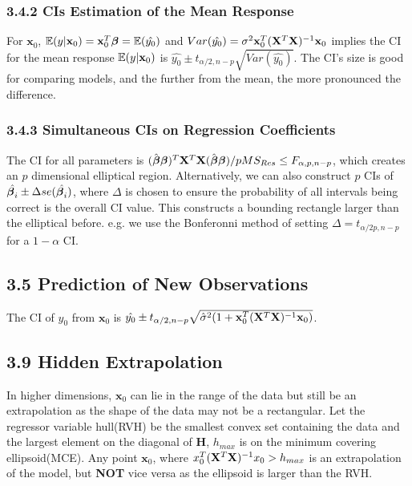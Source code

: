 \begin{multicols*}{3}
\subsubsection{3.4.2 CIs Estimation of the Mean Response}
For $\mathbf{x}_0$, $\mathbb{E}(y|\mathbf{x}_0) = \mathbf{x}_0^T\boldsymbol{\beta} = \mathbb{E}(\hat{y_0})$ and $Var(\hat{y_0}) = \sigma^2\mathbf{x}_0^T(\mathbf{X}^T\mathbf{X})^{-1}\mathbf{x}_0$ implies the CI for the mean response $\mathbb{E}(y|\mathbf{x}_0)$ is $\hat{y_0} \pm t_{\alpha/2,n-p}\sqrt{Var(\hat{y_0})}$. The CI's size is good for comparing models, and the further from the mean, the more pronounced the difference.

\subsubsection{3.4.3 Simultaneous CIs on Regression Coefficients}
The CI for all parameters is $(\hat{\boldsymbol{\beta}}\boldsymbol{\beta})^T\mathbf{X}^T\mathbf{X}(\hat{\boldsymbol{\beta}}\boldsymbol{\beta})/pMS_{Res} \leq F_{\alpha,p,n-p}$, which creates an $p$ dimensional elliptical region. Alternatively, we can also construct $p$ CIs of $\hat{\boldsymbol{\beta}_i} \pm \Delta se(\hat{\boldsymbol{\beta}_i})$, where $\Delta$ is chosen to ensure the probability of all intervals being correct is the overall CI value. This constructs a bounding rectangle larger than the elliptical before. e.g. we use the Bonferonni method of setting $\Delta = t_{\alpha/2p,n-p}$ for a $1-\alpha$ CI.

\subsection{3.5 Prediction of New Observations}
The CI of $y_0$ from $\mathbf{x}_0$ is $\hat{y_0} \pm t_{\alpha/2,n-p}\sqrt{\hat{\sigma}^2(1 + \mathbf{x}_0^T(\mathbf{X}^T\mathbf{X})^{-1}\mathbf{x}_0)}$.

\subsection{3.9 Hidden Extrapolation}
In higher dimensions, $\mathbf{x}_0$ can lie in the range of the data but still be an extrapolation as the shape of the data may not be a rectangular. Let the regressor variable hull(RVH) be the smallest convex set containing the data and the largest element on the diagonal of $\mathbf{H}$, $h_{max}$ is on the minimum covering ellipsoid(MCE). Any point $\mathbf{x}_0$, where $x_0^T(\mathbf{X}^T\mathbf{X})^{-1}x_0 > h_{max}$ is an extrapolation of the model, but \textbf{NOT} vice versa as the ellipsoid is larger than the RVH.


\end{multicols*}
